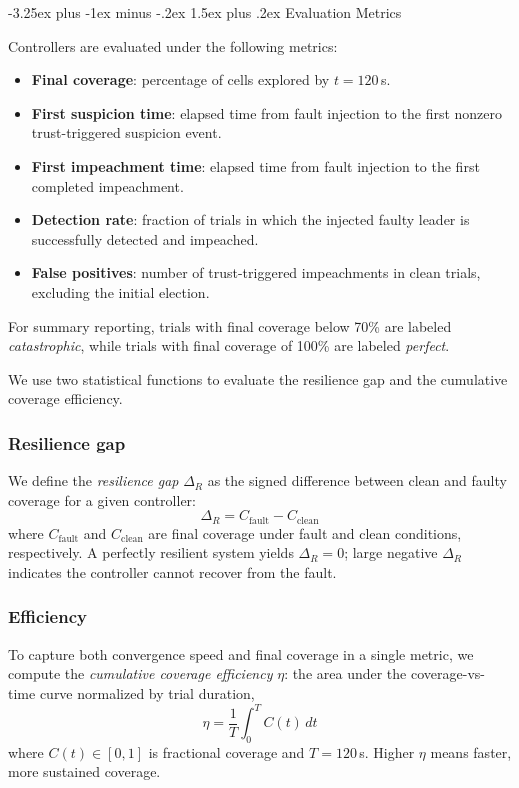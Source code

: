 \documentclass[conference]{IEEEtran}
\makeatletter
\renewcommand{\subsection}{\@startsection{subsection}{2}{\z@}%
  {-3.25ex plus -1ex minus -.2ex}%
  {1.5ex plus .2ex}%
  {\normalfont\normalsize\itshape\centering}}
\makeatother
\begin{document}
\subsection{Evaluation Metrics}

Controllers are evaluated under the following metrics:

\begin{itemize}
    \item \textbf{Final coverage}: percentage of cells explored by $t=120\,$s.
    \item \textbf{First suspicion time}: elapsed time from fault injection to the first nonzero trust-triggered suspicion event.
    \item \textbf{First impeachment time}: elapsed time from fault injection to the first completed impeachment.
    \item \textbf{Detection rate}: fraction of trials in which the injected faulty leader is successfully detected and impeached.
    \item \textbf{False positives}: number of trust-triggered impeachments in clean trials, excluding the initial election.
\end{itemize}

For summary reporting, trials with final coverage below 70\% are labeled \emph{catastrophic}, while trials with final coverage of 100\% are labeled \emph{perfect}.

We use two statistical functions to evaluate the resilience gap and the cumulative coverage efficiency.

\subsubsection{\textbf{Resilience gap}}
We define the \emph{resilience gap} $\Delta_R$ as the signed difference between clean and faulty coverage for a given controller:
\begin{equation}
    \Delta_R = C_{\text{fault}} - C_{\text{clean}}
    \label{eq:resilience_gap}
\end{equation}
where $C_{\text{fault}}$ and $C_{\text{clean}}$ are final coverage under fault and clean conditions, respectively. A perfectly resilient system yields $\Delta_R = 0$; large negative $\Delta_R$ indicates the controller cannot recover from the fault.

\subsubsection{\textbf{Efficiency}}
To capture both convergence speed and final coverage in a single metric, we compute the \emph{cumulative coverage efficiency} $\eta$: the area under the coverage-vs-time curve normalized by trial duration,
\begin{equation}
    \eta = \frac{1}{T} \int_0^{T} C(t)\, dt
    \label{eq:efficiency}
\end{equation}
where $C(t) \in [0,1]$ is fractional coverage and $T = 120\,$s. Higher $\eta$ means faster, more sustained coverage.
\end{document}
